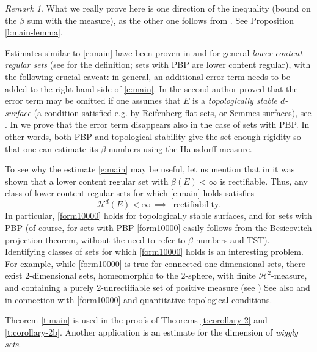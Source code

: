 \documentclass[11pt,reqno]{amsart}
\theoremstyle{definition}
\theoremstyle{remark}
\newtheorem{remark}[theorem]{Remark}
\numberwithin{equation}{section}
\theoremstyle{theorem}
\theoremstyle{definition}
\theoremstyle{remark}
\numberwithin{equation}{section}
\begin{document}
	\begin{remark}
		What we really prove here is one direction of the inequality (bound on the $\beta$ sum with the measure), as the other one follows from \cite{azzam2018analyst}. See Proposition \ref{l:main-lemma}.
	\end{remark}
	Estimates similar to \eqref{e:main} have been proven in \cite{azzam2018analyst} and \cite{azzam2019quantitative} for general \emph{lower content regular sets} (see  for the definition; sets with PBP are lower content regular), with the following crucial caveat: in general, an additional error term needs to be added to the right hand side of \eqref{e:main}. In \cite{villa2019higher} the second author proved that the error term may be omitted if one assumes that $E$ is a \emph{topologically stable $d$-surface} (a condition satisfied e.g. by Reifenberg flat sets, or Semmes surfaces), see \cite[Theorem 3.6]{villa2019higher}. In  we prove that the error term disappears also in the case of sets with PBP.
%
	In other words, both PBP and topological stability give the set enough rigidity so that one can estimate its $\beta$-numbers using the Hausdorff measure. 
	
	To see why the estimate \eqref{e:main} may be useful, let us mention that in \cite[Theorem II]{azzam2018analyst} it was shown that a lower content regular set with $\beta(E)<\infty$ is rectifiable. Thus, any class of lower content regular sets for which \eqref{e:main} holds satisfies
	\begin{equation}\label{form10000}
		\mathcal{H}^d(E)<\infty \, \implies\,  \mbox{ rectifiability.}
	\end{equation}
	In particular, \eqref{form10000} holds for topologically stable surfaces, and for sets with PBP (of course, for sets with PBP \eqref{form10000} easily follows from the Besicovitch projection theorem, without the need to refer to $\beta$-numbers and TST). Identifying classes of sets for which \eqref{form10000} holds is an interesting problem. For example, while \eqref{form10000} is true for connected one dimensional sets, there exist $2$-dimensional sets, homeomorphic to the $2$-sphere, with finite $\mathcal{H}^2$-measure, and containing a purely 2-unrectifiable set of positive measure (see \cite[Figure 1]{villa2019higher}) See also \cite{david2019rectifiability} and \cite{david2020note} in connection with \eqref{form10000} and quantitative topological conditions.
	
	Theorem \ref{t:main} is used in the proofs of Theorems \ref{t:corollary-2} and \ref{t:corollary-2b}. Another application is an estimate for the dimension of \textit{wiggly sets}.
	
\end{document}
